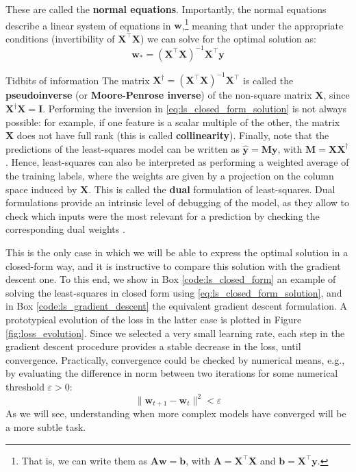 These are called the \textbf{normal equations}. Importantly, the normal equations describe a linear system of equations in $\mathbf{w}$,\footnote{That is, we can write them as $\mathbf{A}\mathbf{w}=\mathbf{b}$, with $\mathbf{A} = \mathbf{X}^\top\mathbf{X}$ and $\mathbf{b} = \mathbf{X}^\top\mathbf{y}$.} meaning that under the appropriate conditions (invertibility of $\mathbf{X}^\top\mathbf{X}$) we can solve for the optimal solution as:
%
\begin{equation}
\mathbf{w}_*=\left(\mathbf{X}^\top\mathbf{X}\right)^{-1}\mathbf{X}^\top\mathbf{y}
\label{eq:ls_closed_form_solution}
\end{equation}

\begin{supportbox}{Tidbits of information}
The matrix $\mathbf{X}^\dagger=\left(\mathbf{X}^\top\mathbf{X}\right)^{-1}\mathbf{X}^\top$ is called the \textbf{pseudoinverse} (or \textbf{Moore-Penrose inverse}) of the non-square matrix $\mathbf{X}$, since $\mathbf{X}^\dagger\mathbf{X}=\mathbf{I}$. Performing the inversion in \eqref{eq:ls_closed_form_solution} is not always possible: for example, if one feature is a scalar multiple of the other, the matrix $\mathbf{X}$ does not have full rank (this is called \textbf{collinearity}). Finally, note that the predictions of the least-squares model can be written as $\hat{\mathbf{y}}=\mathbf{M}\mathbf{y}$, with $\mathbf{M} = \mathbf{X}\mathbf{X}^\dagger$. Hence, least-squares can also be interpreted as performing a weighted average of the training labels, where the weights are given by a projection on the column space induced by $\mathbf{X}$. This is called the \textbf{dual} formulation of least-squares. Dual formulations provide an intrinsic level of debugging of the model, as they allow to check which inputs were the most relevant for a prediction by checking the corresponding dual weights \cite{irie2022dual}. 
\end{supportbox}

This is the only case in which we will be able to express the optimal solution in a closed-form way, and it is instructive to compare this solution with the gradient descent one. To this end, we show in Box \ref{code:ls_closed_form} an example of solving the least-squares in closed form using \eqref{eq:ls_closed_form_solution}, and in Box \ref{code:ls_gradient_descent} the equivalent gradient descent formulation. A prototypical evolution of the loss in the latter case is plotted in Figure \ref{fig:loss_evolution}. Since we selected a very small learning rate, each step in the gradient descent procedure provides a stable decrease in the loss, until convergence. Practically, convergence could be checked by numerical means, e.g., by evaluating the difference in norm between two iterations for some numerical threshold $\varepsilon > 0$:
%
\begin{equation}
    \lVert \mathbf{w}_{t+1} - \mathbf{w}_t \rVert^2 < \varepsilon
\end{equation}
%
As we will see, understanding when more complex models have converged will be a more subtle task.

